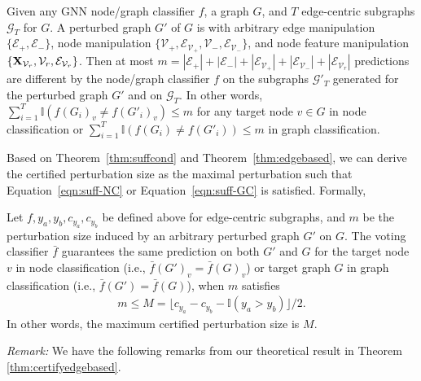 \begin{theorem}
\label{thm:edgebased} 
Given any GNN node/graph classifier $f$, a graph $G$,  
and $T$ edge-centric subgraphs $\mathcal{G}_T$ for $G$. 
A perturbed graph $G'$ of 
$G$ is 
with arbitrary edge manipulation $\{\mathcal{E}_+,\mathcal{E}_-\}$, node manipulation  
$\{\mathcal{V}_+, \mathcal{E}_{\mathcal{V}_+}, \mathcal{V}_-, \mathcal{E}_{\mathcal{V}_-}\}$, and node feature manipulation 
$\{{\bf X}_{\mathcal{V}_r}, \mathcal{V}_r, \mathcal{E}_{\mathcal{V}_r}\}$. 
Then at most $m=|\mathcal{E}_+| + |\mathcal{E}_-| + |\mathcal{E}_{\mathcal{V}_+}| + |\mathcal{E}_{\mathcal{V}_-}| + |\mathcal{E}_{\mathcal{V}_r}|$ 
predictions are different by the node/graph classifier $f$ on the subgraphs $\mathcal{G}'_T$ generated for the perturbed graph $G'$ and on $\mathcal{G}_T$. 
In other words, $\sum_{i=1}^{T}\mathbb{I}(f(G_{i})_v\neq f(G'_{i})_v) \leq m$ for any target node $v \in G$ in node classification or $\sum_{i=1}^{T}\mathbb{I}(f(G_{i})\neq f(G'_{i})) \leq m$ in graph classification. 
\end{theorem}

Based on Theorem~\ref{thm:suffcond} and Theorem~\ref{thm:edgebased}, we can derive the certified perturbation size as the maximal perturbation such that Equation~\ref{eqn:suff-NC} or Equation~\ref{eqn:suff-GC} is satisfied. Formally,

\begin{theorem}
\vspace{-2mm}
\label{thm:certifyedgebased} 
Let $f, y_a, y_b, c_{y_a}, c_{y_b}$ be defined above for edge-centric subgraphs, and   
$m$ be the perturbation size induced by an arbitrary perturbed graph $G'$ on $G$. 
The voting classifier $\bar{f}$ guarantees the same prediction on both $G'$ and $G$ for the target node $v$ in node classification (i.e., $\bar{f}(G')_v = \bar{f}(G)_v$) or target graph $G$ in graph classification (i.e., $\bar{f}(G') = \bar{f}(G)$), when $m$ satisfies
\begin{align}
\label{eqn:cpz_edge}
m \leq M = {\lfloor c_{y_a}-c_{y_b}-\mathbb{I}(y_{a}>y_{b})\rfloor} / {2}.
\end{align}
In other words, the maximum certified perturbation size is  $M$.
\end{theorem}
\noindent \emph{Remark:} We have the following remarks from our theoretical result in Theorem \ref{thm:certifyedgebased}. 

